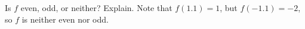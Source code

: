 {Is $f$ even, odd, or neither? Explain.}
{ Note that $f(1.1) = 1$, but $f(-1.1)=-2$, so $f$ is neither even nor odd.}